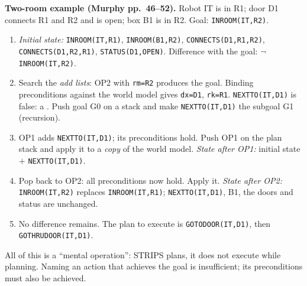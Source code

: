 \textbf{Two-room example (Murphy pp.~46--52).} Robot IT is in R1; door D1 connects R1 and R2 and is open; box B1 is in R2. Goal: \texttt{INROOM(IT,R2)}.
\par{}\par\smallskip
\begin{enumerate}
\item \emph{Initial state:} \texttt{INROOM(IT,R1)}, \texttt{INROOM(B1,R2)}, \texttt{CONNECTS(D1,R1,R2)}, \texttt{CONNECTS(D1,R2,R1)}, \texttt{STATUS(D1,OPEN)}. Difference with the goal: $\neg$\texttt{INROOM(IT,R2)}.
\item Search the \emph{add lists}: OP2 with \texttt{rm=R2} produces the goal. Binding preconditions against the world model gives \texttt{dx=D1}, \texttt{rk=R1}. \texttt{NEXTTO(IT,D1)} is false: a . Push goal G0 on a stack and make \texttt{NEXTTO(IT,D1)} the subgoal G1 (recursion).
\item OP1 adds \texttt{NEXTTO(IT,D1)}; its preconditions hold. Push OP1 on the plan stack and apply it to a \emph{copy} of the world model. \emph{State after OP1:} initial state $+$ \texttt{NEXTTO(IT,D1)}.
\item Pop back to OP2: all preconditions now hold. Apply it. \emph{State after OP2:} \texttt{INROOM(IT,R2)} replaces \texttt{INROOM(IT,R1)}; \texttt{NEXTTO(IT,D1)}, B1, the doors and status are unchanged.
\item No difference remains. The plan to execute is \texttt{GOTODOOR(IT,D1)}, then \texttt{GOTHRUDOOR(IT,D1)}.
\end{enumerate}
All of this is a ``mental operation'': STRIPS plans, it does not execute while planning. Naming an action that achieves the goal is insufficient; its preconditions must also be achieved.

